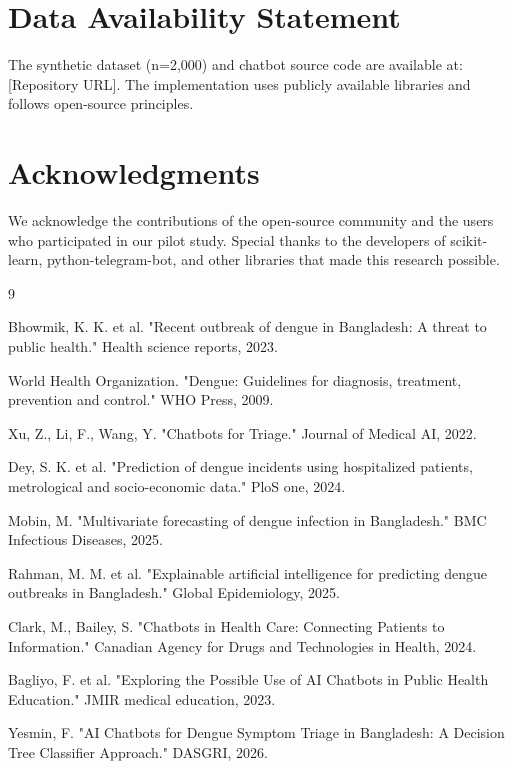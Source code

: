 \documentclass[conference]{IEEEtran}
\begin{document}
\section*{Data Availability Statement}
The synthetic dataset (n=2,000) and chatbot source code are available at: [Repository URL]. The implementation uses publicly available libraries and follows open-source principles.

\section*{Acknowledgments}
We acknowledge the contributions of the open-source community and the users who participated in our pilot study. Special thanks to the developers of scikit-learn, python-telegram-bot, and other libraries that made this research possible.


\begin{thebibliography}{9}

Bhowmik, K. K. et al. "Recent outbreak of dengue in Bangladesh: A threat to public health." Health science reports, 2023.

World Health Organization. "Dengue: Guidelines for diagnosis, treatment, prevention and control." WHO Press, 2009.

Xu, Z., Li, F., Wang, Y. "Chatbots for Triage." Journal of Medical AI, 2022.

Dey, S. K. et al. "Prediction of dengue incidents using hospitalized patients, metrological and socio-economic data." PloS one, 2024.

Mobin, M. "Multivariate forecasting of dengue infection in Bangladesh." BMC Infectious Diseases, 2025.

Rahman, M. M. et al. "Explainable artificial intelligence for predicting dengue outbreaks in Bangladesh." Global Epidemiology, 2025.

Clark, M., Bailey, S. "Chatbots in Health Care: Connecting Patients to Information." Canadian Agency for Drugs and Technologies in Health, 2024.

Bagliyo, F. et al. "Exploring the Possible Use of AI Chatbots in Public Health Education." JMIR medical education, 2023.

Yesmin, F. "AI Chatbots for Dengue Symptom Triage in Bangladesh: A Decision Tree Classifier Approach." DASGRI, 2026.

\end{thebibliography}
\end{document}
